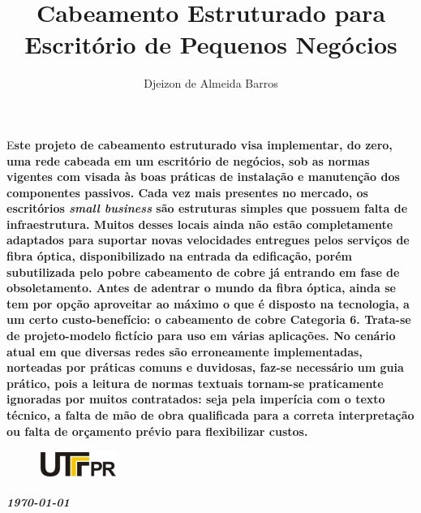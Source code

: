 \documentclass[	DIV=calc,%
							paper=a4,%
							fontsize=12pt,%
							onecolumn]{scrartcl}	 					%
\title{Cabeamento Estruturado para Escritório de Pequenos Negócios}
\author{Djeizon de Almeida Barros}  	%
\date{}																				%
\newcommand{\initial}[1]{%
     \lettrine[lines=3,lhang=0.3,nindent=0em]{
     				\color{DarkBlue}
     				{\textsf{#1}}}{}}
\begin{document}
\maketitle
\thispagestyle{fancy} 	
\thispagestyle{empty}		%



\initial{E}\textbf{ste projeto de cabeamento estruturado visa implementar, do zero, uma rede cabeada em um escritório de negócios, sob as normas vigentes com visada às boas práticas de instalação e manutenção dos componentes passivos. Cada vez mais presentes no mercado, os escritórios \textit{small business} são estruturas simples que possuem falta de infraestrutura. Muitos desses locais ainda não estão completamente adaptados para suportar novas velocidades entregues pelos serviços de fibra óptica, disponibilizado na entrada da edificação, porém subutilizada pelo pobre cabeamento de cobre já entrando em fase de obsoletamento. Antes de adentrar o mundo da fibra óptica, ainda se tem por opção aproveitar ao máximo o que é disposto na tecnologia, a um certo custo-benefício: o cabeamento de cobre Categoria 6. Trata-se de projeto-modelo fictício para uso em várias aplicações. No cenário atual em que diversas redes são erroneamente implementadas, norteadas por práticas comuns e duvidosas, faz-se necessário um guia prático, pois a leitura de normas textuais tornam-se praticamente ignoradas por muitos contratados: seja pela imperícia com o texto técnico, a falta de mão de obra qualificada para a correta interpretação ou falta de orçamento prévio para flexibilizar custos.}


\begin{figure}
	\centering
	\includegraphics{utfpr}
\end{figure}

\vspace{2cm}
\centerline{\textit{\textbf{\today}}}

\clearpage
    \renewcommand*\listfigurename{Lista de figuras}
\listoffigures

\renewcommand*\listtablename{Lista de tabelas}
\listoftables
\end{document}
